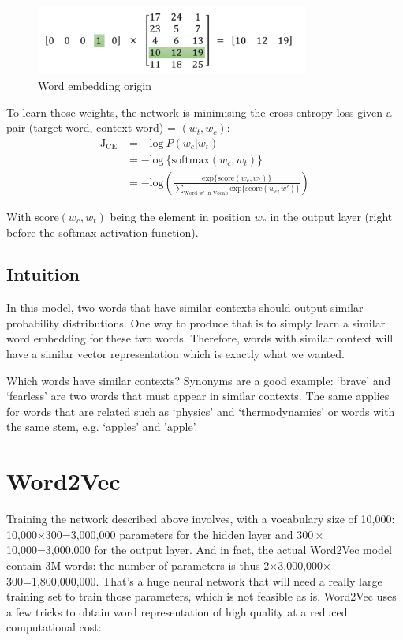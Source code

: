 \begin{figure}[H]
    \centering
    \includegraphics[width=0.8\textwidth]{Images/onehot-matrix.png}
    \caption{Word embedding origin\cite{word2vec-architecture}}
\end{figure}

\newpage
To learn those weights, the network is minimising the cross-entropy loss given a pair (target word, context word) = $(w_t, w_c)$:
\begin{align}
    \text{J}_{\text{CE}}   &=  -\text{log}~P(w_c | w_t) \nonumber\\
    &= -\text{log}~\{\text{softmax}(w_c, w_t)\}\nonumber\\
    &= -\text{log}\left(\frac{\text{exp}\{\text{score}(w_c, w_t)\}}{\sum_{\text{Word w' in Vocab}}\text{exp}\{\text{score}(w_c, w')\}} \right)
    \label{cross-entropy}
\end{align}

With $\text{score}(w_c, w_t)$ being the element in position $w_c$ in the output layer (right before the softmax activation function).

\subsection{Intuition}
In this model, two words that have similar contexts should output similar probability distributions. One way to produce that is to simply learn a similar word embedding for these two words. Therefore, words with similar context will have a similar vector representation which is exactly what we wanted.

Which words have similar contexts? Synonyms are a good example: `brave' and `fearless' are two words that must appear in similar contexts. The same applies for words that are related such as `physics' and `thermodynamics' or words with the same stem, e.g. `apples' and 'apple'. 

\newpage
\section{Word2Vec}
Training the network described above involves, with a vocabulary size of 10,000: 10,000$\times300$=3,000,000 parameters for the hidden layer and $300\times$10,000=3,000,000 for the output layer. And in fact, the actual Word2Vec model contain 3M words: the number of parameters is thus 2$\times$3,000,000$\times$300=1,800,000,000. That's a huge neural network that will need a really large training set to train those parameters, which is not feasible as is. Word2Vec uses a few tricks to obtain word representation of high quality at a reduced computational cost:

